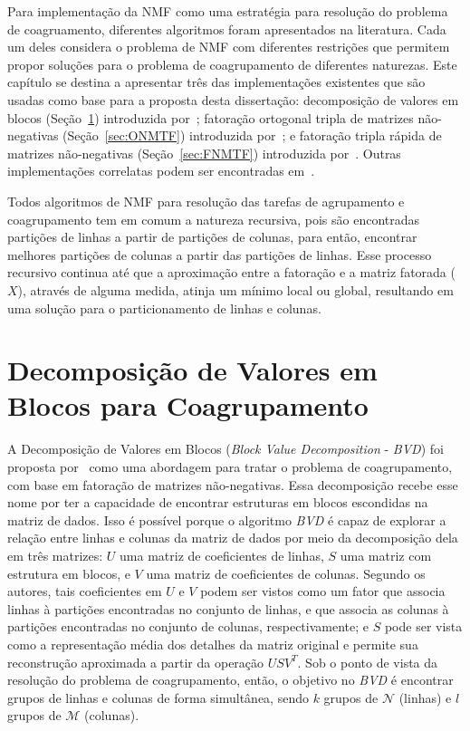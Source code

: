 \documentclass[
    12pt,                %
    oneside,            %
    a4paper,            %
    english,            %
    brazil                %
    ]{abntex2ppgsi}
\begin{document}
Para implementação da NMF como uma estratégia para resolução do problema de coagruamento, diferentes algoritmos foram apresentados na literatura.
Cada um deles considera o problema de NMF com diferentes restrições que permitem propor soluções para o problema de coagrupamento de diferentes naturezas.
Este capítulo se destina a apresentar três das implementações existentes que são usadas como base para a proposta desta dissertação: decomposição de valores em blocos (Seção~\ref{sec:bvd}) introduzida por~; fatoração ortogonal tripla de matrizes não-negativas (Seção~\ref{sec:ONMTF}) introduzida por~; e fatoração tripla rápida de matrizes não-negativas (Seção~\ref{sec:FNMTF}) introduzida por~.
Outras implementações correlatas podem ser encontradas em~\cite{Li2006}.

Todos algoritmos de NMF para resolução das tarefas de agrupamento e coagrupamento tem em comum a natureza recursiva, pois são encontradas partições de linhas a partir de partições de colunas, para então, encontrar melhores partições de colunas a partir das partições de linhas.
Esse processo recursivo continua até que a aproximação entre a fatoração e a matriz fatorada ($X$), através de alguma medida, atinja um mínimo local ou global, resultando em uma solução para o particionamento de linhas e colunas.

\section{Decomposição de Valores em Blocos para Coagrupamento}
\label{sec:bvd}

A Decomposição de Valores em Blocos (\textit{Block Value Decomposition} - \textit{BVD}) foi proposta por~ como uma abordagem para tratar o problema de coagrupamento, com base em fatoração de matrizes não-negativas.
Essa decomposição recebe esse nome por ter a capacidade de encontrar estruturas em blocos escondidas na matriz de dados.
Isso é possível porque o algoritmo \textit{BVD} é capaz de explorar a relação entre linhas e colunas da matriz de dados por meio da decomposição dela em três matrizes: $U$ uma matriz de coeficientes de linhas, $S$ uma matriz com estrutura em blocos, e $V$ uma matriz de coeficientes de colunas.
Segundo os autores, tais coeficientes em $U$ e $V$ podem ser vistos como um fator que associa linhas à partições encontradas no conjunto de linhas, e que associa as colunas à partições encontradas no conjunto de colunas, respectivamente; e $S$ pode ser vista como a representação média dos detalhes da matriz original e permite sua reconstrução aproximada a partir da operação $USV^T$.
Sob o ponto de vista da resolução do problema de coagrupamento, então, o objetivo no \textit{BVD} é encontrar grupos de linhas e colunas de forma simultânea, sendo $k$ grupos de $\mathcal{N}$ (linhas) e $l$ grupos de $\mathcal{M}$ (colunas).
\end{document}
